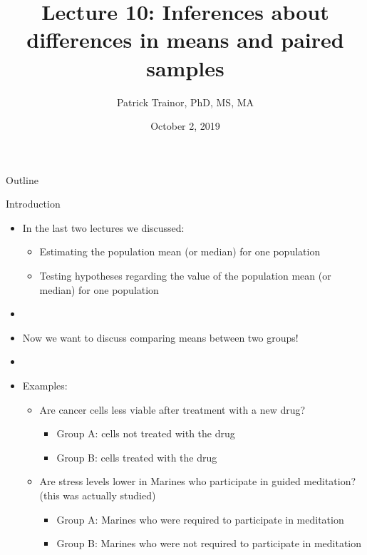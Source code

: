 \documentclass[xcolor=dvipsnames]{beamer}
\title[Lecture 10]{Lecture 10: Inferences about differences in means and paired samples}
\author[Patrick Trainor]{Patrick Trainor, PhD, MS, MA}
\institute[NMSU]{New Mexico State University}
\date{October 2, 2019}
\begin{document}
\begin{frame}
\maketitle
\end{frame}

\begin{frame}{Outline}
\tableofcontents[hideallsubsections]
\end{frame}

\begin{frame}{Introduction}
	\begin{itemize}
		\item In the last two lectures we discussed: \pause
		\begin{itemize}
			\item Estimating the population mean (or median) for one population \pause
			\item Testing hypotheses regarding the value of the population mean (or median) for one population \pause
		\end{itemize}
	\item[]
	\item Now we want to discuss comparing means between two groups! \pause
	\item[]
	\item Examples: \pause
	\begin{itemize}
		\item Are cancer cells less viable after treatment with a new drug?  \pause
			\begin{itemize}
				\item Group A: cells not treated with the drug
				\item Group B: cells treated with the drug \pause
			\end{itemize}
		\item Are stress levels lower in Marines who participate in guided meditation? (this was actually studied) \pause
			\begin{itemize}
				\item Group A: Marines who were required to participate in meditation
				\item Group B: Marines who were not required to participate in meditation
			\end{itemize}
	\end{itemize}
	\end{itemize}
\end{frame}
\end{document}
